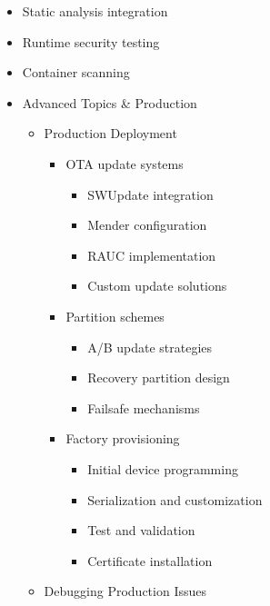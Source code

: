 \documentclass[
]{article}
\providecommand{\tightlist}{%
  \setlength{\itemsep}{0pt}\setlength{\parskip}{0pt}}
\begin{document}
\begin{itemize}
\begin{itemize}
\begin{itemize}
      \begin{itemize}
      \tightlist
      \item
        Static analysis integration
      \item
        Runtime security testing
      \item
        Container scanning
      \end{itemize}
    \end{itemize}
  \end{itemize}
\end{itemize}

\begin{itemize}
\tightlist
\item
  Advanced Topics \& Production

  \begin{itemize}
  \tightlist
  \item
    Production Deployment

    \begin{itemize}
    \tightlist
    \item
      OTA update systems

      \begin{itemize}
      \tightlist
      \item
        SWUpdate integration
      \item
        Mender configuration
      \item
        RAUC implementation
      \item
        Custom update solutions
      \end{itemize}
    \item
      Partition schemes

      \begin{itemize}
      \tightlist
      \item
        A/B update strategies
      \item
        Recovery partition design
      \item
        Failsafe mechanisms
      \end{itemize}
    \item
      Factory provisioning

      \begin{itemize}
      \tightlist
      \item
        Initial device programming
      \item
        Serialization and customization
      \item
        Test and validation
      \item
        Certificate installation
      \end{itemize}
    \end{itemize}
  \item
    Debugging Production Issues


\end{itemize}
\end{itemize}
\end{document}
